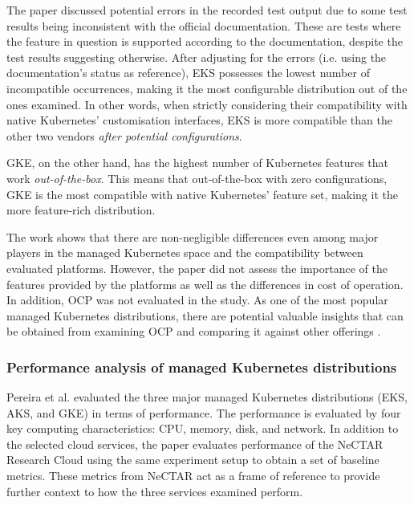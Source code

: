 The paper discussed potential errors in the recorded test output due to some test results being inconsistent with the official documentation. These are tests where the feature in question is supported according to the documentation, despite the test results suggesting otherwise. After adjusting for the errors (i.e. using the documentation's status as reference), EKS possesses the lowest number of incompatible occurrences, making it the most configurable distribution out of the ones examined. In other words, when strictly considering their compatibility with native Kubernetes' customisation interfaces, EKS is more compatible than the other two vendors \textit{after potential configurations}.

GKE, on the other hand, has the highest number of Kubernetes features that work \textit{out-of-the-box}. This means that out-of-the-box with zero configurations, GKE is the most compatible with native Kubernetes' feature set, making it the more feature-rich distribution.

The work shows that there are non-negligible differences even among major players in the managed Kubernetes space and the compatibility between evaluated platforms. However, the paper did not assess the importance of the features provided by the platforms as well as the differences in cost of operation. In addition, OCP was not evaluated in the study. As one of the most popular managed Kubernetes distributions, there are potential valuable insights that can be obtained from examining OCP and comparing it against other offerings \cite{redhatinc.StateKubernetesSecurity2024, vrabicDigitalTwinsUnderstanding2018, portworxKubernetesAdoptionSurvey2021, broadcomStateKubernetes20232023}.


\subsubsection{Performance analysis of managed Kubernetes distributions}

Pereira et al. \cite{pereiraferreiraPerformanceEvaluationContainers2019} evaluated the three major managed Kubernetes distributions (EKS, AKS, and GKE) in terms of performance. The performance is evaluated by four key computing characteristics: CPU, memory, disk, and network. In addition to the selected cloud services, the paper evaluates performance of the NeCTAR Research Cloud using the same experiment setup to obtain a set of baseline metrics. These metrics from NeCTAR act as a frame of reference to provide further context to how the three services examined perform.

